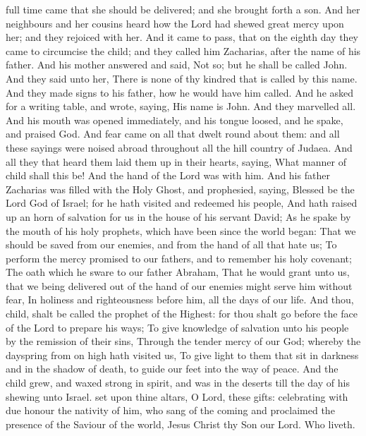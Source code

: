  full time came that she should be delivered; and she brought forth a son. And her neighbours and her cousins heard how the Lord had shewed great mercy upon her; and they rejoiced with her. And it came to pass, that on the eighth day they came to circumcise the child; and they called him Zacharias, after the name of his father. And his mother answered and said, Not so; but he shall be called John. And they said unto her, There is none of thy kindred that is called by this name. And they made signs to his father, how he would have him called. And he asked for a writing table, and wrote, saying, His name is John. And they marvelled all. And his mouth was opened immediately, and his tongue loosed, and he spake, and praised God. And fear came on all that dwelt round about them: and all these sayings were noised abroad throughout all the hill country of Judaea. And all they that heard them laid them up in their hearts, saying, What manner of child shall this be! And the hand of the Lord was with him. And his father Zacharias was filled with the Holy Ghost, and prophesied, saying, Blessed be the Lord God of Israel; for he hath visited and redeemed his people, And hath raised up an horn of salvation for us in the house of his servant David; As he spake by the mouth of his holy prophets, which have been since the world began: That we should be saved from our enemies, and from the hand of all that hate us; To perform the mercy promised to our fathers, and to remember his holy covenant; The oath which he sware to our father Abraham, That he would grant unto us, that we being delivered out of the hand of our enemies might serve him without fear, In holiness and righteousness before him, all the days of our life. And thou, child, shalt be called the prophet of the Highest: for thou shalt go before the face of the Lord to prepare his ways; To give knowledge of salvation unto his people by the remission of their sins, Through the tender mercy of our God; whereby the dayspring from on high hath visited us, To give light to them that sit in darkness and in the shadow of death, to guide our feet into the way of peace. And the child grew, and waxed strong in spirit, and was in the deserts till the day of his shewing unto Israel.
\secret
\label{JohnSecret}
 set upon thine altars, O Lord, these gifts: celebrating with due honour the nativity of him, who sang of the coming and proclaimed the presence of the Saviour of the world, Jesus Christ thy Son our Lord. Who liveth.
